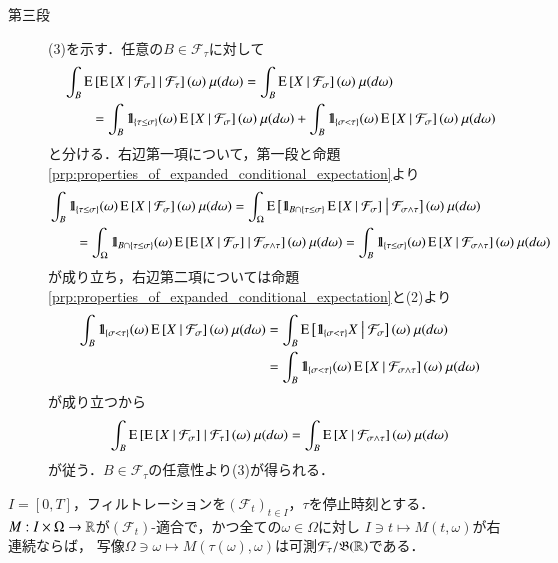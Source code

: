 \begin{prf}
\begin{description}
			\item[第三段]
				(3)を示す．任意の$B \in \mathcal{F}_\tau$に対して
				\begin{align}
					&\int_B \cexp{\cexp{X}{\mathcal{F}_\sigma}}{\mathcal{F}_\tau}(\omega)\ \mu(d\omega)
					= \int_B \cexp{X}{\mathcal{F}_\sigma}(\omega)\ \mu(d\omega) \\
					&\qquad = \int_B \defunc_{\{\tau \leq \sigma\}}(\omega) \cexp{X}{\mathcal{F}_\sigma}(\omega)\ \mu(d\omega)
						+ \int_B \defunc_{\{\sigma < \tau\}}(\omega) \cexp{X}{\mathcal{F}_\sigma}(\omega)\ \mu(d\omega)
				\end{align}
				と分ける．右辺第一項について，第一段と命題\ref{prp:properties_of_expanded_conditional_expectation}より
				\begin{align}
					&\int_B \mbox{1}\hspace{-0.25em}\mbox{l}_{\{\tau \leq \sigma\}}(\omega) \operatorname{E} \left[ X \ \middle|\ \mathcal{F}_\sigma \right](\omega)\ \mu(d\omega)
					= \int_\Omega \operatorname{E} \left[ \mbox{1}\hspace{-0.25em}\mbox{l}_{B \cap \{\tau \leq \sigma\}} \operatorname{E} \left[ X \ \middle|\ \mathcal{F}_\sigma \right] \ \middle|\ \mathcal{F}_{\sigma \wedge \tau} \right](\omega)\ \mu(d\omega) \\
					&\qquad = \int_\Omega \mbox{1}\hspace{-0.25em}\mbox{l}_{B \cap \{\tau \leq \sigma\}}(\omega) \operatorname{E} \left[ \operatorname{E} \left[ X \ \middle|\ \mathcal{F}_\sigma \right] \ \middle|\ \mathcal{F}_{\sigma \wedge \tau} \right](\omega)\ \mu(d\omega)
					= \int_B \mbox{1}\hspace{-0.25em}\mbox{l}_{\{\tau \leq \sigma\}}(\omega) \operatorname{E} \left[ X \ \middle|\ \mathcal{F}_{\sigma \wedge \tau} \right](\omega)\ \mu(d\omega)
				\end{align}
				が成り立ち，右辺第二項については命題\ref{prp:properties_of_expanded_conditional_expectation}と(2)より
				\begin{align}
					\int_B \mbox{1}\hspace{-0.25em}\mbox{l}_{\{\sigma < \tau\}}(\omega) \operatorname{E} \left[ X \ \middle|\ \mathcal{F}_\sigma \right](\omega)\ \mu(d\omega)
					&= \int_B \operatorname{E} \left[ \mbox{1}\hspace{-0.25em}\mbox{l}_{\{\sigma < \tau\}} X \ \middle|\ \mathcal{F}_\sigma \right](\omega)\ \mu(d\omega) \\
					&= \int_B \mbox{1}\hspace{-0.25em}\mbox{l}_{\{\sigma < \tau\}}(\omega) \operatorname{E} \left[ X \ \middle|\ \mathcal{F}_{\sigma \wedge \tau} \right](\omega)\ \mu(d\omega)
				\end{align}
				が成り立つから
				\begin{align}
					\int_B \cexp{\cexp{X}{\mathcal{F}_\sigma}}{\mathcal{F}_\tau}(\omega)\ \mu(d\omega)
					= \int_B \cexp{X}{\mathcal{F}_{\sigma \wedge \tau}}(\omega)\ \mu(d\omega)
				\end{align}
				が従う．$B \in \mathcal{F}_\tau$の任意性より(3)が得られる．
				\QED
		\end{description}
	\end{prf}
	
	\begin{screen}
		\begin{thm}[停止時刻との合成写像の可測性]
			$I = [0,T]$，フィルトレーションを$(\mathcal{F}_t)_{t \in I}$，$\tau$を停止時刻とする．
			$M:I \times \Omega \rightarrow \mathbb{R}$が$(\mathcal{F}_t)$-適合で，かつ全ての$\omega \in \Omega$に対し
			$I \ni t \longmapsto M(t,\omega)$が右連続ならば，
			写像$\Omega \ni \omega \longmapsto M(\tau(\omega),\omega)$は可測$\mathcal{F}_\tau/\mathfrak{B}(\mathbb{R})$である．
			\label{thm:measurability_of_stopping_time}
		\end{thm}
	\end{screen}
	
